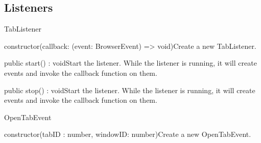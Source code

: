 \subsection{Listeners}
\begin{class}{TabListener}




\begin{constructors}
\begin{constructor}{constructor(callback: (event: BrowserEvent) => void)}{Create a new TabListener.}
\begin{parameters}
\end{parameters}
\end{constructor}
\end{constructors}
\begin{methods}
\begin{method}{public start() : void}{Start the listener. While the listener is running, it will create events and invoke the callback function on them.}
\end{method}
\begin{method}{public stop() : void}{Start the listener. While the listener is running, it will create events and invoke the callback function on them.}
\end{method}
\end{methods}
\end{class}

\begin{class}{OpenTabEvent}




\begin{constructors}
\begin{constructor}{constructor(tabID : number, windowID: number)}{Create a new OpenTabEvent.}
\begin{parameters}
\end{parameters}
\end{constructor}
\end{constructors}
\end{class}

